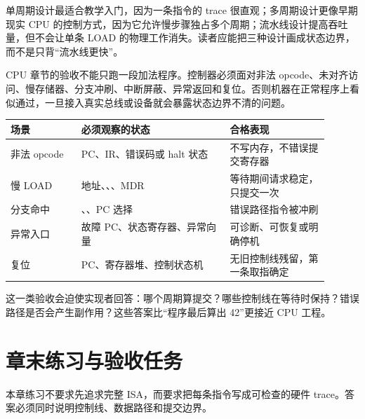 单周期设计最适合教学入门，因为一条指令的 trace 很直观；多周期设计更像早期现实 CPU 的控制方式，因为它允许慢步骤独占多个周期；流水线设计提高吞吐量，但不会让单条 LOAD 的物理工作消失。读者应能把三种设计画成状态边界，而不是只背“流水线更快”。

CPU 章节的验收不能只跑一段加法程序。控制器必须面对非法 opcode、未对齐访问、慢存储器、分支冲刷、中断屏蔽、异常返回和复位。否则机器在正常程序上看似通过，一旦接入真实总线或设备就会暴露状态边界不清的问题。

\begin{longtable}{L{0.2\linewidth}L{0.42\linewidth}L{0.28\linewidth}}
\toprule
场景 & 必须观察的状态 & 合格表现 \\
\midrule
非法 opcode & PC、IR、错误码或 halt 状态 & 不写内存，不错误提交寄存器 \\
慢 LOAD & 地址、、、MDR & 等待期间请求稳定，只提交一次 \\
分支命中 & 、、PC 选择 & 错误路径指令被冲刷 \\
异常入口 & 故障 PC、状态寄存器、异常向量 & 可诊断、可恢复或明确停机 \\
复位 & PC、寄存器堆、控制状态机 & 无旧控制线残留，第一条取指确定 \\
\bottomrule
\end{longtable}

这一类验收会迫使实现者回答：哪个周期算提交？哪些控制线在等待时保持？错误路径是否会产生副作用？这些答案比“程序最后算出 42”更接近 CPU 工程。



\section*{章末练习与验收任务}

本章练习不要求先追求完整 ISA，而要求把每条指令写成可检查的硬件 trace。答案必须同时说明控制线、数据路径和提交边界。

